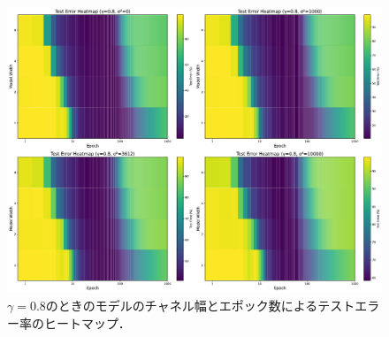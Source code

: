 \begin{figure}[H]
    \centering
    \includegraphics[width=\linewidth]{fig/heatmap_ln/ln0.8.pdf}
    \caption{$\gamma=0.8$のときのモデルのチャネル幅とエポック数によるテストエラー率のヒートマップ．}
    \label{fig:modelwidth_heatmap_0.8}
\end{figure}

